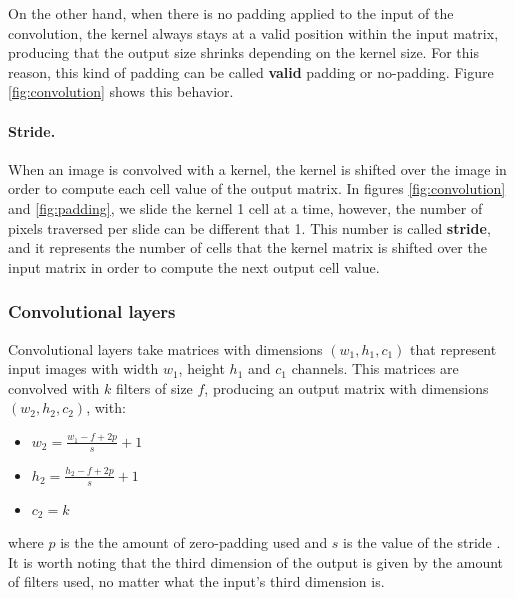 On the other hand, when there is no padding applied to the input of the convolution, the kernel always stays at a valid position within the input matrix, producing that the output size shrinks depending on the kernel size. For this reason, this kind of padding can be called \textbf{valid} padding or no-padding. Figure \ref{fig:convolution} shows this behavior.

\paragraph{Stride.}
When an image is convolved with a kernel, the kernel is shifted over the image in order to compute each cell value of the output matrix. In figures \ref{fig:convolution} and \ref{fig:padding}, we slide the kernel 1 cell at a time, however, the number of pixels traversed per slide can be different that 1. This number is called \textbf{stride}, and it represents the number of cells that the kernel matrix is shifted over the input matrix in order to compute the next output cell value.

\subsubsection*{Convolutional layers}
Convolutional layers take matrices with dimensions $(w_1, h_1, c_1)$ that represent input images with width $w_1$, height $h_1$ and $c_1$ channels. This matrices are convolved with $k$ filters of size $f$, producing an output matrix with dimensions $(w_2, h_2, c_2)$, with:

\begin{itemize}
	\item $w_2 = \frac{w_1 - f + 2p}{s} + 1$
	\item $h_2 = \frac{h_2 - f + 2p}{s} + 1$
	\item $c_2 = k$
\end{itemize}
where $p$ is the the amount of zero-padding used and $s$ is the value of the stride \cite{STANFORD}. It is worth noting that the third dimension of the output is given by the amount of filters used, no matter what the input's third dimension is.

